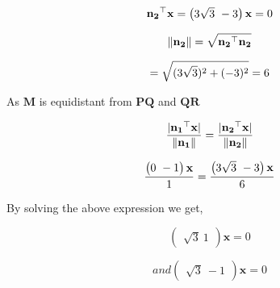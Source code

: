 \documentclass[journal,10pt,twocolumn]{article}
\let\vec\mathbf
\begin{document}
\begin{equation}
\vec{n_2}^\top \vec{x}  =  \begin{pmatrix} 3\sqrt{3}  \ -3  \end{pmatrix}\vec{x} = 0 
\vspace{0.1cm}
\end{equation}
    
\begin{equation}
\lVert \vec{n_2}  \rVert = \sqrt{{\vec{n_2}}^\top \vec{n_2}}  
\vspace{0.1cm}
\end{equation}
    
\begin{equation}
=  \sqrt{(3\sqrt{3})^2 + (-3)^2} = 6
\vspace{0.1cm}
\end{equation}
    
    As  $\vec{M}$  is equidistant from  $\vec{PQ}$  and  $\vec{QR}$ 
    
\begin{equation}
\frac{\lvert \mathbf{\vec{n_1}}^\top \vec{x} \rvert}{\lVert\vec{n_1} \rVert}  =  \frac{\lvert \mathbf{\vec{n_2}}^\top \vec{x} \rvert}{\lVert \vec{n_2} \rVert} 
\vspace{0.1cm}
\end{equation}
    
\begin{equation}
\frac{\begin{pmatrix} 0  \ -1  \end{pmatrix}\vec{x}}{1} = \frac{\begin{pmatrix} 3\sqrt{3}  \ -3 \end{pmatrix}\vec{x}}{6} 
\vspace{0.1cm}
\end{equation}
    
    By solving the above expression we get,
    \vspace{0.1cm}
    
\begin{equation}
    \begin{pmatrix} \sqrt{3}  \ 1\end{pmatrix}\vec{x} = 0
\end{equation}

\begin{equation}
    and \begin{pmatrix} \sqrt{3}  \ -1  \end{pmatrix}\vec{x} = 0
\end{equation}
\end{document}
